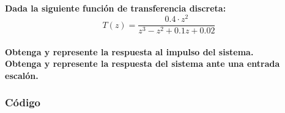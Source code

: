 \documentclass[a4paper, 12pt]{article}
\begin{document}
    \newpage
    \subsection{}
    \paragraph{Dada la siguiente función de transferencia discreta:\\ \[ T(z) = \frac{0.4 \cdot z^2}{z^3 - z^2 + 0.1z + 0.02} \] \\ {\small Obtenga y represente la respuesta al impulso del sistema. \\ Obtenga y represente la respuesta del sistema ante una entrada escalón.}}

    \subsubsection*{Código}
	\inputminted[fontsize=\scriptsize, linenos, breaklines=true, xleftmargin=0.75cm, frame=lines]{matlab}{code/parte2/Ej1p3.m}
\end{document}

